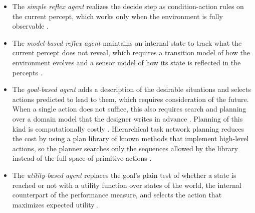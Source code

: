 \begin{itemize}
	\item The \emph{simple reflex agent} realizes the decide step as condition-action rules on the current percept, which works only when the environment is fully observable \cite[Chap.~2]{russellArtificialIntelligenceModern2022}.
	\item The \emph{model-based reflex agent} maintains an internal state to track what the current percept does not reveal, which requires a transition model of how the environment evolves and a sensor model of how its state is reflected in the percepts \cite[Chap.~2]{russellArtificialIntelligenceModern2022}.
	\item The \emph{goal-based agent} adds a description of the desirable situations and selects actions predicted to lead to them, which requires consideration of the future. When a single action does not suffice, this also requires search and planning over a domain model that the designer writes in advance \cite[Chap.~2]{russellArtificialIntelligenceModern2022}. Planning of this kind is computationally costly \cite[Chap.~2]{russellArtificialIntelligenceModern2022}. Hierarchical task network planning reduces the cost by using a plan library of known methods that implement high-level actions, so the planner searches only the sequences allowed by the library instead of the full space of primitive actions \cite[Chap.~11]{russellArtificialIntelligenceModern2022}.
	\item The \emph{utility-based agent} replaces the goal's plain test of whether a state is reached or not with a utility function over states of the world, the internal counterpart of the performance measure, and selects the action that maximizes expected utility \cite[Chap.~2]{russellArtificialIntelligenceModern2022}.
\end{itemize}

